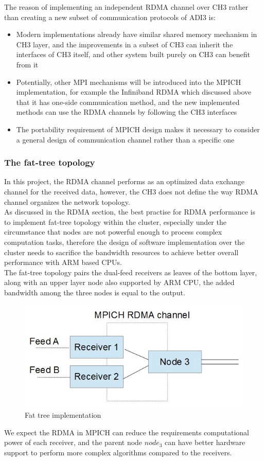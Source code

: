 \documentclass[11pt,openright,a4paper]{report}
\begin{document}
The reason of implementing an independent RDMA channel over CH3 rather than creating a new subset of communication protocols of ADI3 is:
\begin{itemize}
	\item Modern implementations already have similar shared memory mechanism in CH3 layer, and the improvements in a subset of CH3 can inherit the interfaces of CH3 itself, and other system built purely on CH3 can benefit from it
	\item Potentially, other MPI mechanisms will be introduced into the MPICH implementation, for example the Infiniband RDMA which discussed above that it has one-side communication method, and the new implemented methods can use the RDMA channels by following the CH3 interfaces
	\item The portability requirement of MPICH design makes it necessary to consider a general design of communication channel rather than a specific one
\end{itemize} 
\subsubsection{The fat-tree topology}
In this project, the RDMA channel performs as an optimized data exchange channel for the received data, however, the CH3 does not define the way RDMA channel organizes the network topology.\\
As discussed in the RDMA section, the best practise for RDMA performance is to implement fat-tree topology within the cluster, especially under the circumstance that nodes are not powerful enough to process complex computation tasks, therefore the design of software implementation over the cluster needs to sacrifice the bandwidth resources to achieve better overall performance with ARM based CPUs.\\
The fat-tree topology pairs the dual-feed receivers as leaves of the bottom layer, along with an upper layer node also supported by ARM CPU, the added bandwidth among the three nodes is equal to the output.
\begin{figure}[H]
\centering
\includegraphics[width=0.7\linewidth]{picture/fattreeimpl}
\caption{Fat tree implementation}
\label{fig:fattreeimpl}
\end{figure}
We expect the RDMA in MPICH can reduce the requirements computational power of each receiver, and the parent node $node_{3}$ can have better hardware support to perform more complex algorithms compared to the receivers.\\
\end{document}

